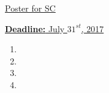 \underline{Poster for SC} 



\underline{\textbf{Deadline:} July $31^{st}$, 2017}
\begin{enumerate} 
\item 
\item
\item 
\item 
\end{enumerate}
